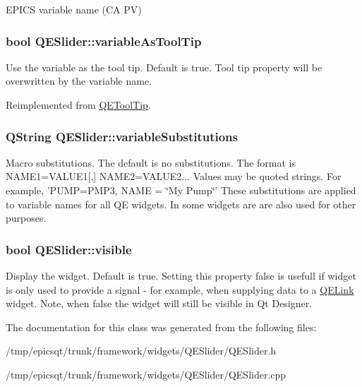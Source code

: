 \label{classQESlider_a05487f9ab40b5e702c667d9f5f85ed11}
EPICS variable name (CA PV) \hypertarget{classQESlider_a83070f4d66da78e7724f99ad0307edd8}{
\subsubsection[{variableAsToolTip}]{\setlength{\rightskip}{0pt plus 5cm}bool QESlider::variableAsToolTip}}
\label{classQESlider_a83070f4d66da78e7724f99ad0307edd8}
Use the variable as the tool tip. Default is true. Tool tip property will be overwritten by the variable name. 

Reimplemented from \hyperlink{classQEToolTip}{QEToolTip}.

\hypertarget{classQESlider_a5fceb1ae46d97fff9a7126d37187e4d3}{
\subsubsection[{variableSubstitutions}]{\setlength{\rightskip}{0pt plus 5cm}QString QESlider::variableSubstitutions}}
\label{classQESlider_a5fceb1ae46d97fff9a7126d37187e4d3}
Macro substitutions. The default is no substitutions. The format is NAME1=VALUE1\mbox{[},\mbox{]} NAME2=VALUE2... Values may be quoted strings. For example, 'PUMP=PMP3, NAME = \char`\"{}My Pump\char`\"{}' These substitutions are applied to variable names for all QE widgets. In some widgets are are also used for other purposes. \hypertarget{classQESlider_aa9b8d77780b3bf701cf7cfa3f3834f19}{
\subsubsection[{visible}]{\setlength{\rightskip}{0pt plus 5cm}bool QESlider::visible}}
\label{classQESlider_aa9b8d77780b3bf701cf7cfa3f3834f19}
Display the widget. Default is true. Setting this property false is usefull if widget is only used to provide a signal -\/ for example, when supplying data to a \hyperlink{classQELink}{QELink} widget. Note, when false the widget will still be visible in Qt Designer. 

The documentation for this class was generated from the following files:\begin{DoxyCompactItemize}
\item 
/tmp/epicsqt/trunk/framework/widgets/QESlider/QESlider.h\item 
/tmp/epicsqt/trunk/framework/widgets/QESlider/QESlider.cpp\end{DoxyCompactItemize}
